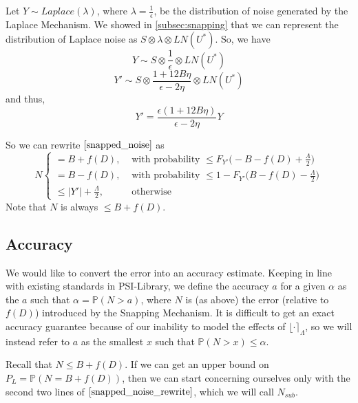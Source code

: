 \documentclass[11pt]{scrartcl} %
\begin{document}
Let $Y \sim Laplace(\lambda)$, where $\lambda = \frac{1}{\epsilon}$, be the distribution of noise generated by the Laplace Mechanism.
We showed in \autoref{subsec:snapping} that we can represent the distribution of Laplace noise as $S \otimes \lambda \otimes LN(U^*)$. So, we have
\[ Y \sim S \otimes \frac{1}{\epsilon} \otimes LN(U^*) \]
\[ Y' \sim S \otimes \frac{1 + 12B\eta}{\epsilon - 2\eta} \otimes LN(U^*) \]
and thus,
\[ Y' = \frac{\epsilon(1 + 12B\eta)}{\epsilon - 2\eta}Y \]

So we can rewrite $\eqref{snapped_noise}$ as
\begin{equation}
	\label{snapped_noise_rewrite}
	N
		\begin{cases}
			= B + f(D), &\text{ with probability } \leq F_{Y'} \big( -B - f(D) + \frac{\Lambda}{2} \big)  \\
			= B - f(D), &\text{ with probability } \leq 1 - F_{Y'} \big( B - f(D) - \frac{\Lambda}{2} \big)  \\
			\leq \vert Y' \vert + \frac{\Lambda}{2}, &\text{ otherwise }
		\end{cases}
\end{equation}
Note that $N$ is always $\leq B + f(D)$.

\subsection{Accuracy}
We would like to convert the error into an accuracy estimate. Keeping in line with existing standards in PSI-Library, we define the accuracy $a$ for a given $\alpha$ as the $a$ such that $\alpha = \mathbb{P}(N > a)$, where $N$ is (as above) the error (relative to $f(D)$) introduced by the Snapping Mechanism. It is difficult to get an exact accuracy guarantee because of our inability to model the effects of $\lfloor \cdot \rceil_\Lambda$, so we will instead refer to $a$ as the smallest $x$ such that $\mathbb{P}(N > x) \leq \alpha$. \newline

Recall that $N \leq B + f(D)$. If we can get an upper bound on $P_{L} = \mathbb{P}(N = B + f(D))$, then we can start concerning ourselves only with the second two lines of $\eqref{snapped_noise_rewrite}$, which we will call $N_{sub}$. \newline
\end{document}
